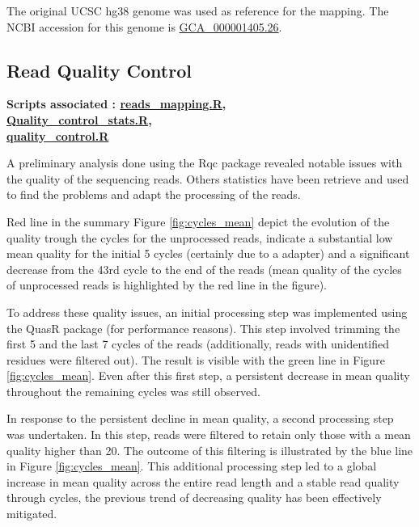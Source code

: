 \documentclass[a4paper, 11pt]{article}
\begin{document}
\begin{multicols}{2}
The original UCSC hg38 genome was used as reference for the mapping. The NCBI accession for this genome is \href{https://www.ncbi.nlm.nih.gov/datasets/genome/GCF_000001405.26/}{GCA\_000001405.26}.


\subsection{Read Quality Control}
\begin{scriptsize}
	 \textbf{Scripts associated : \href{https://github.com/leopoldguyot/BINF-402_Transcriptomic_Project/blob/main/reads_mapping.R}{reads\_mapping.R},\\
	 	  \href{https://github.com/leopoldguyot/BINF-402_Transcriptomic_Project/blob/main/Quality_control_stats.R}{Quality\_control\_stats.R}, \\
	 	  \href{https://github.com/leopoldguyot/BINF-402_Transcriptomic_Project/blob/main/quality_control.R}{quality\_control.R}}
\end{scriptsize}


A preliminary analysis done using the Rqc package \citep{Rqc} revealed notable issues with the quality of the sequencing reads. Others statistics have been retrieve and used to find the problems and adapt the processing of the reads. 

Red line in the summary Figure \ref{fig:cycles_mean} depict the evolution of the quality trough the cycles for the unprocessed reads, indicate a substantial low mean quality for the initial 5 cycles (certainly due to a adapter) and a significant decrease from the 43rd cycle to the end of the reads (mean quality of the cycles of unprocessed reads is highlighted by the red line in the figure).

To address these quality issues, an initial processing step was implemented using the QuasR package \citep{QuasR} (for performance reasons). This step involved trimming the first 5 and the last 7 cycles of the reads (additionally, reads with unidentified residues were filtered out). The result is visible with the green line in Figure \ref{fig:cycles_mean}. Even after this first step, a persistent decrease in mean quality throughout the remaining cycles was still observed.

In response to the persistent decline in mean quality, a second processing step was undertaken. In this step, reads were filtered to retain only those with a mean quality higher than 20. The outcome of this filtering is illustrated by the blue line in Figure \ref{fig:cycles_mean}. This additional processing step led to a global increase in mean quality across the entire read length and a stable read quality through cycles, the previous trend of decreasing quality has been effectively mitigated.



\end{multicols}
\end{document}
